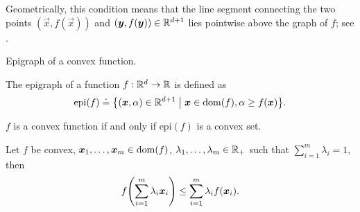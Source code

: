 Geometrically, this condition means that the line segment connecting the two points
$(\vec{x},f(\vec{x}))$ and $(\bm{y},f(\bm{y})) \in \mathbb{R}^{d+1}$ lies pointwise above the graph of
$f$; see .

\begin{marginfigure}
    \centering
    \caption{Epigraph of a convex function.}
    \label{fig:epigraph}
\end{marginfigure}

\begin{definition}[Epigraph]
    The epigraph of a function $f: \mathbb{R}^d \to \mathbb{R}$ is defined as \[
        \mathrm{epi}(f) \doteq \lft\{ (\vec{x},\alpha)\in \R^{d+1} \;\middle|\; \vec{x}\in\dom{f},\alpha\geq f(\vec{x}) \rgt\}.
    \]
\end{definition}

\begin{lemma}
    $f$ is a convex function if and only if $\mathrm{epi}(f)$ is a convex set.
\end{lemma}

\begin{lemma}
    Let $f$ be convex, $\bm{x}_1,\ldots,\bm{x}_m\in\mathrm{dom}(f)$, $\lambda_1,\ldots,\lambda_m\in \mathbb{R}_+$ such that $\sum_{i=1}^m \lambda_i = 1$, then \[
        f \lft( \sum_{i=1}^m \lambda_i \vec{x}_i \rgt) \leq \sum_{i=1}^{m} \lambda_i f(\vec{x}_i).
    \]
\end{lemma}

